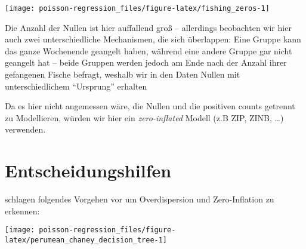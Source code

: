 \documentclass[ngerman,a4paper,]{scrartcl}
\newenvironment{Shaded}{\begin{snugshade}}{\end{snugshade}}
\newcommand{\CommentTok}[1]{\textcolor[rgb]{0.56,0.35,0.01}{\textit{#1}}}
\newcommand{\DataTypeTok}[1]{\textcolor[rgb]{0.13,0.29,0.53}{#1}}
\newcommand{\DecValTok}[1]{\textcolor[rgb]{0.00,0.00,0.81}{#1}}
\newcommand{\FloatTok}[1]{\textcolor[rgb]{0.00,0.00,0.81}{#1}}
\newcommand{\KeywordTok}[1]{\textcolor[rgb]{0.13,0.29,0.53}{\textbf{#1}}}
\newcommand{\NormalTok}[1]{#1}
\newcommand{\OperatorTok}[1]{\textcolor[rgb]{0.81,0.36,0.00}{\textbf{#1}}}
\newcommand{\StringTok}[1]{\textcolor[rgb]{0.31,0.60,0.02}{#1}}
\theoremstyle{definition}
\theoremstyle{definition}
\theoremstyle{definition}
\theoremstyle{remark}
\begin{document}
\begin{Shaded}
\end{Shaded}

\begin{center}\texttt{[image: poisson-regression\_files/figure-latex/fishing\_zeros-1]} \end{center}

Die Anzahl der Nullen ist hier auffallend groß -- allerdings beobachten wir hier auch zwei unterschiedliche Mechanismen, die sich überlappen: Eine Gruppe kann das ganze Wochenende geangelt haben, während eine andere Gruppe gar nicht geangelt hat -- beide Gruppen werden jedoch am Ende nach der Anzahl ihrer gefangenen Fische befragt, weshalb wir in den Daten Nullen mit unterschiedlichem \enquote{Ursprung} erhalten

Da es hier nicht angemessen wäre, die Nullen und die positiven counts getrennt zu Modellieren, würden wir hier ein \emph{zero-inflated} Modell (z.B ZIP, ZINB, \ldots{}) verwenden.

\hypertarget{entscheidungshilfen}{%
\section{Entscheidungshilfen}\label{entscheidungshilfen}}

\citet{perumean-chaneyZeroinflatedOverdispersedWhat2013} schlagen folgendes Vorgehen vor um Overdispersion und Zero-Inflation zu erkennen:

\begin{center}\texttt{[image: poisson-regression\_files/figure-latex/perumean\_chaney\_decision\_tree-1]} \end{center}
\end{document}
